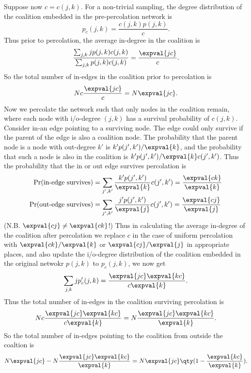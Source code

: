 Suppose now $c = c(j,k)$. For a non-trivial sampling, the degree distribution of the coalition embedded in the pre-percolation network is
\begin{equation}
p_c(j,k) = \frac{c(j,k)p(j,k)}{c}.
\end{equation}
Thus prior to percolation, the average in-degree in the coalition is
\begin{equation}
\frac{\sum_{j,k} j p(j,k) c(j,k)}{\sum_{j,k} p(j,k) c(j,k)} = \frac{\expval{jc}}{c}.
\end{equation}
So the total number of in-edges in the coalition prior to percolation is
\begin{equation}
Nc \frac{\expval{jc}}{c} = N\expval{jc}.
\end{equation}
Now we percolate the network such that only nodes in the coalition remain, where each node with i/o-degree $(j,k)$ has a survival probability of $c(j,k)$. Consider in-an edge pointing to a surviving node. The edge could only survive if the parent of the edge is also a coalition node. The probability that the parent node is a node with out-degree $k'$ is $k'p(j',k')/\expval{k}$, and the probability that such a node is also in the coalition is $k'p(j',k')/\expval{k} c(j',k')$. Thus the probability that the in or out edge survives percolation is
\begin{align}
\Pr(\text{in-edge survives}) &= \sum_{j',k'} \frac{k'p(j',k')}{\expval{k}} c(j',k') = \frac{\expval{ck}}{\expval{k}} \\
\Pr(\text{out-edge survives}) &= \sum_{j',k'} \frac{j'p(j',k')}{\expval{j}} c(j',k') = \frac{\expval{cj}}{\expval{j}}
\end{align}
(N.B. $\expval{cj} \neq \expval{ck}$!) Thus in calculating the average in-degree of the coalition after percolation we replace $c$ in the case of uniform percolation with $\expval{ck}/\expval{k}$ or $\expval{cj}/\expval{j}$ in appropriate places, and also update the i/o-degree distribution of the coalition embedded in the original netwokr $p(j,k)$ to $p_c(j,k)$, we now get
\begin{equation}
\sum_{j,k} j p_c'(j,k) = \frac{\expval{jc}\expval{kc}}{c\expval{k}}.
\end{equation}
Thus the total number of in-edges in the coalition surviving percolation is
\begin{equation}
Nc \frac{\expval{jc}\expval{kc}}{c\expval{k}} = N\frac{\expval{jc}\expval{kc}}{\expval{k}}.
\end{equation}
So the total number of in-edges pointing to the coalition from outside the coaltion is
\begin{equation}
 N\expval{jc} - N\frac{\expval{jc}\expval{kc}}{\expval{k}} = N\expval{jc}\qty(1-\frac{\expval{kc}}{\expval{k}}).
\end{equation}

